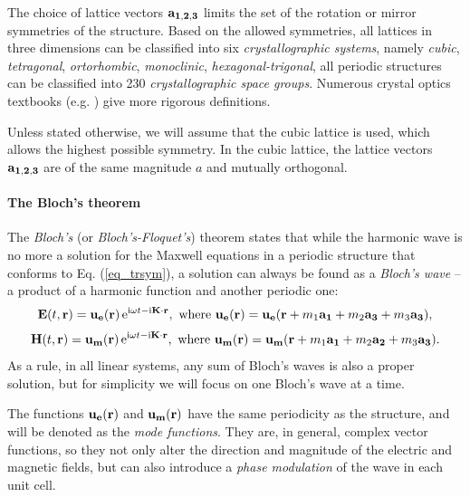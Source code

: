 The choice of lattice vectors ${\mathbf{a_{1,2,3}}}$ limits the set of the rotation or mirror symmetries of the structure. Based on the allowed symmetries, all lattices in three dimensions can be classified into six \textit{crystallographic systems}, namely \textit{cubic}, \textit{tetragonal}, \textit{ortorhombic}, \textit{monoclinic}, \textit{hexagonal-trigonal}, all periodic structures can be classified into 230 \textit{crystallographic space groups}. Numerous crystal optics textbooks (e.g. \cite[p. 678]{born1999book}) give more rigorous definitions. 

Unless stated otherwise, we will assume that the cubic lattice is used, which allows the highest possible symmetry. In the cubic lattice, the lattice vectors ${\mathbf{a_{1,2,3}}}$ are of the same magnitude $a$ and mutually orthogonal. %

\paragraph{The Bloch's theorem}%
The \textit{Bloch's} (or \textit{Bloch's-Floquet's}) theorem states that while the harmonic wave is no more a solution for the Maxwell equations in a periodic structure that conforms to Eq. (\ref{eq_trsym}), a solution can always be found as a \textit{Bloch's wave} -- a product of a harmonic function and another periodic one:
\begin{equation} 
\mathbf{E}(t, {\mathbf{r}}) = \mathbf{u_e}({\mathbf{r}})\,\mathrm{e}^{{\mathrm i}\omega t - {\mathrm i}{\mathbf{K}}\cdot{\mathbf{r}}}, \text{ where } \mathbf{u_e}({\mathbf{r}}) = \mathbf{u_e}({\mathbf{r}} + m_1 {\mathbf{a_1}} + m_2 {\mathbf{a_3}} + m_3 {\mathbf{a_3}}),
\label{eq_bloch}\end{equation} 
\begin{equation}
\mathbf{H}(t, {\mathbf{r}}) = \mathbf{u_m}({\mathbf{r}})\,\mathrm{e}^{{\mathrm i}\omega t - {\mathrm i}{\mathbf{K}}\cdot{\mathbf{r}}}, \text{ where } \mathbf{u_m}({\mathbf{r}}) = \mathbf{u_m}({\mathbf{r}} + m_1 {\mathbf{a_1}} + m_2 {\mathbf{a_2}} + m_3 {\mathbf{a_3}}).
\label{eq_blochh}\end{equation} 
As a rule, in all linear systems, any sum of Bloch's waves is also a proper solution, but for simplicity we will focus on one Bloch's wave at a time.

The functions $\mathbf{u_e}({\mathbf{r}})$ and $\mathbf{u_m}({\mathbf{r}})$ have the same periodicity as the structure, and will be denoted as the \textit{mode functions}. They are, in general, complex vector functions, so they not only alter the direction and magnitude of the electric and magnetic fields, but can also introduce a \textit{phase modulation} of the wave in each unit cell. 

